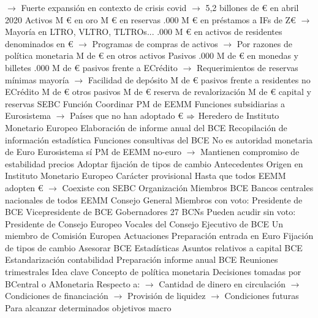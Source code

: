 \documentclass{nuevotema}
\begin{document}
\begin{esquemal}
				\4[] $\to$ Fuerte expansión en contexto de crisis covid
				\4[] $\to$ 5,2 billones de € en abril 2020
				\4 Activos
				 M € en oro
				 M € en reservas
				.000 M € en préstamos a IFs de Z€
				\4[] $\to$ Mayoría en LTRO, VLTRO, TLTROs...
				.000 M € en activos de residentes denominados en €
				\4[] $\to$ Programas de compras de activos
				\4[] $\to$ Por razones de política monetaria
				 M de € en otros activos
				\4 Pasivos
				.000 M de € en monedas y billetes
				.000 M de € pasivos frente a ECrédito
				\4[] $\to$ Requerimientos de reservas mínimas mayoría
				\4[] $\to$ Facilidad de depósito
				 M de € pasivos frente a residentes no ECrédito
				 M de € otros pasivos
				 M de € reserva de revalorización
				 M de € capital y reservas
		\2 SEBC
			\3 Función
				\4 Coordinar PM de EEMM
				\4[] Funciones subsidiarias a Eurosistema
				\4[] $\to$ Países que no han adoptado €
				\4[] $\Rightarrow$ Heredero de Instituto Monetario Europeo
				\4 Elaboración de informe anual del BCE
				\4 Recopilación de información estadística
				\4 Funciones consultivas del BCE
				\4 No es autoridad monetaria de Euro
				\4[] Eurosistema sí
				\4[] PM de EEMM no-euro
				\4[] $\to$ Mantienen compromiso de estabilidad precios
				\4 Adoptar fijación de tipos de cambio
			\3 Antecedentes
				\4 Origen en Instituto Monetario Europeo
				\4 Carácter provisional
				\4[] Hasta que todos EEMM adopten €
				\4[] $\to$ Coexiste con SEBC
			\3 Organización
				\4 Miembros
				\4[] BCE
				\4[] Bancos centrales nacionales de todos EEMM
				\4 Consejo General
				\4 Miembros con voto:
				\4[] Presidente de BCE
				\4[] Vicepresidente de BCE
				\4[] Gobernadores 27 BCNs
				\4 Pueden acudir sin voto:
				\4[] Presidente de Consejo Europeo
				\4[] Vocales del Consejo Ejecutivo de BCE
				\4[] Un miembro de Comisión Europea
			\3 Actuaciones
				\4 Preparación entrada en Euro
				\4[] Fijación de tipos de cambio
				\4 Asesorar BCE
				\4 Estadísticas
				\4 Asuntos relativos a capital BCE
				\4 Estandarización contabilidad
				\4 Preparación informe anual BCE
				\4 Reuniones trimestrales
	\1 
		\2 Idea clave
			\3 Concepto de política monetaria
				\4 Decisiones tomadas por BCentral o AMonetaria
				\4[] Respecto a:
				\4[] $\to$ Cantidad de dinero en circulación
				\4[] $\to$ Condiciones de financiación
				\4[] $\to$ Provisión de liquidez
				\4[] $\to$ Condiciones futuras
				\4 Para alcanzar determinados objetivos macro

\end{esquemal}
\end{document}
